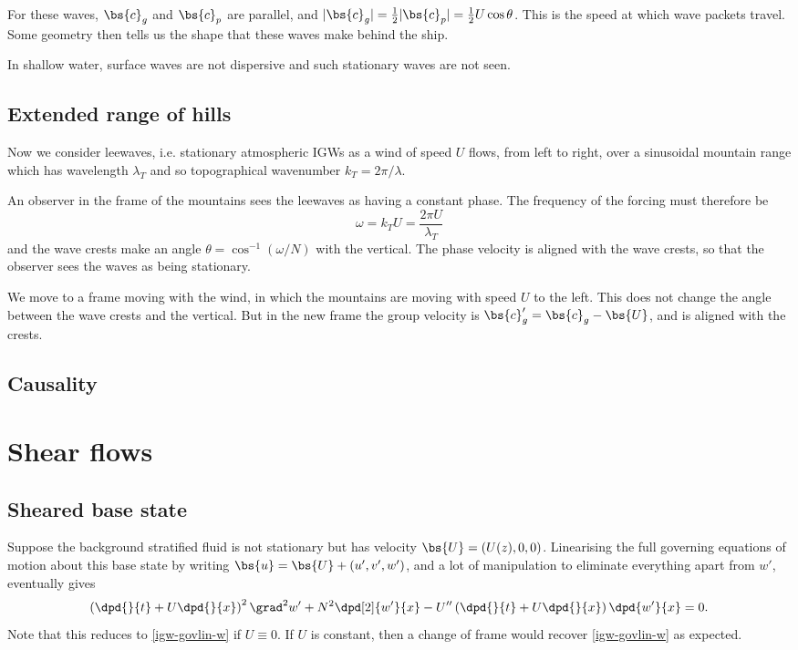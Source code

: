 For these waves, $\bs{c}_g$ and $\bs{c}_p$ are parallel, and $|\bs{c}_g| =
\frac{1}{2} |\bs{c}_p| = \frac{1}{2}U\cos\theta$. This is the speed at which
wave packets travel. Some geometry then tells us the shape that these waves make
behind the ship.

In shallow water, surface waves are not dispersive and such stationary waves are
not seen.

\subsection{Extended range of hills}

Now we consider leewaves, i.e. stationary atmospheric IGWs as a wind of speed
$U$ flows, from left to right, over a sinusoidal mountain range which has
wavelength $\lambda_T$ and so topographical wavenumber $k_T = 2\pi/\lambda$. 

An observer in the frame of the mountains sees the leewaves as having a constant phase. The frequency of the forcing must therefore be
\begin{equation}
	\omega = k_T U = \frac{2\pi U}{\lambda_T}
\end{equation}
and the wave crests make an angle $\theta = \cos^{-1} (\omega/N)$ with the vertical. The phase velocity is aligned with the wave crests, so that the observer sees the waves as being stationary.

We move to a frame moving with the wind, in which the mountains are moving with speed $U$ to the left. This does not change the angle between the wave crests and the vertical. But in the new frame the group velocity is $\bs{c}'_g = \bs{c}_g - \bs{U}$, and is aligned with the crests. 

\subsection{Causality}

\section{Shear flows}

\subsection{Sheared base state}

Suppose the background stratified fluid is not stationary but has velocity $\bs{U} = (U(z),0,0)$. Linearising the full governing equations of motion about this base state by writing $\bs{u} = \bs{U} + (u',v',w')$, and a lot of manipulation to eliminate everything apart from $w'$, eventually gives
\begin{equation}
	\left(\dpd{}{t} + U\dpd{}{x}\right)^2 \grad^2 w' + N^2 \dpd[2]{w'}{x} - U''\left(\dpd{}{t} + U\dpd{}{x}\right)\dpd{w'}{x} = 0.
\end{equation}
Note that this reduces to \ref{igw-govlin-w} if $U\equiv0$. If $U$ is constant, then a change of frame would recover \ref{igw-govlin-w} as expected.

